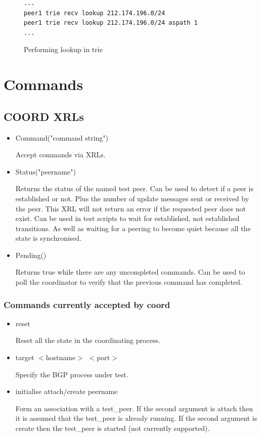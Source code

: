 \documentclass[11pt]{article}
\begin{document}
\begin{figure}[htb]
\small
\begin{verbatim}
...
peer1 trie recv lookup 212.174.196.0/24
peer1 trie recv lookup 212.174.196.0/24 aspath 1
...
\end{verbatim}
\vspace{-0.1in}
\caption{\label{prog:trie_lookup}Performing lookup in trie}
\end{figure}

\section{Commands}

\subsection{\label{coord:command}COORD XRLs}
\begin{itemize}

\item Command("command string")

  Accept commands via XRLs.

\item Status("peername")

  Returns the status of the named test peer. Can be used to detect if a
  peer is established or not. Plus the number of update messages sent
  or received by the peer. This XRL will not return an error if the
  requested peer does not exist. Can be used in test scripts to wait
  for established, not established transitions. As well as waiting for
  a peering to become quiet because all the state is
  synchronised.

\item Pending()

  Returns true while there are any uncompleted commands. Can be used
  to poll the coordinator to verify that the previous command has
  completed.

\end{itemize}

\subsubsection{Commands currently accepted by coord}

\begin{itemize}

  \item {\sf reset}

  Reset all the state in the coordinating process.

  \item {\sf target $<$hostname$>$ $<$port$>$}

  Specify the BGP process under test.

  \item {\sf initialise attach$/$create peername}

  Form an association with a test\_peer. If the second argument is attach then
  it is assumed that the test\_peer is already running. If the second
  argument is create then the test\_peer is started (not currently
  supported).

\end{itemize}
\end{document}

